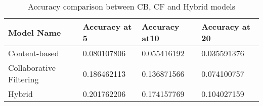\vspace{-2em}
\begin{table}[H]
\begin{tabular}{|l|l|l|l|}
\hline
\rowcolor[HTML]{C0C0C0} 
{\color[HTML]{000000} \textbf{Model   Name}}   & {\color[HTML]{000000} \textbf{Accuracy at 5}} & {\color[HTML]{000000} \textbf{Accuracy at10}} & {\color[HTML]{000000} \textbf{Accuracy at 20}} \\ \hline
{\color[HTML]{000000} Content-based}           & {\color[HTML]{000000} 0.080107806}            & {\color[HTML]{000000} 0.055416192}            & {\color[HTML]{000000} 0.035591376}             \\ \hline
{\color[HTML]{000000} Collaborative Filtering} & {\color[HTML]{000000} 0.186462113}            & {\color[HTML]{000000} 0.136871566}            & {\color[HTML]{000000} 0.074100757}             \\ \hline
{\color[HTML]{000000} Hybrid}                  & {\color[HTML]{000000} 0.201762206}            & {\color[HTML]{000000} 0.174157769}            & {\color[HTML]{000000} 0.104027159}             \\ \hline
\end{tabular}
\caption{Accuracy comparison between CB, CF and Hybrid models}
\label{tb:accuracy}
\end{table}


